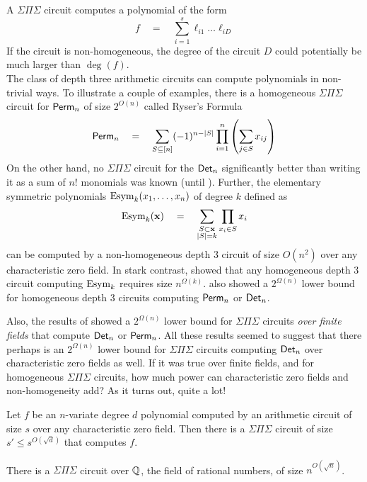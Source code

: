\documentclass{beatcs}
\newcommand{\spaced}[1]{\quad#1\quad}
\newcommand{\SPS}{\Sigma\Pi\Sigma}
\begin{document}
A $\Sigma\Pi\Sigma$ circuit computes a polynomial of the form
\[
f\quad=\quad \sum_{i=1}^s \ell_{i1}\dots \ell_{iD}
\]
If the circuit is non-homogeneous, the degree of the circuit $D$ could potentially be much larger than $\deg(f)$. \\

The class of depth three arithmetic circuits can compute polynomials in non-trivial ways. To illustrate a couple of examples, there is a homogeneous $\SPS$ circuit for $\mathsf{Perm}_n$ of size $2^{O(n)}$ called Ryser's Formula \cite{rys63}
\begin{equation}\label{eqn:ryser}
\Perm_n \spaced{=} \sum_{S \subseteq[n]} (-1)^{n - |S|} \prod_{i=1}^n \inparen{\sum_{j\in S} x_{ij}}
\end{equation}
On the other hand, no $\SPS$ circuit for the $\mathsf{Det}_n$ significantly better than writing it as a sum of $n!$ monomials was known (until \cite{gkks13b}). 
Further, the elementary symmetric polynomials $\mathrm{Esym}_k(x_1,\dots, x_n)$ of degree $k$ defined as
\[
\ESym_k(\vecx) \spaced{=} \sum_{\substack{S\subset \vecx\\|S| = k}} \prod_{x_i\in S}x_i
\]
can be computed by a non-homogeneous depth $3$ circuit of size $O(n^2)$ over any characteristic zero field. In stark contrast, \cite{nw1997} showed that any homogeneous depth $3$ circuit computing $\mathrm{Esym}_k$ requires size $n^{\Omega(k)}$. \cite{nw1997} also showed a $2^{\Omega(n)}$ lower bound for homogeneous depth $3$ circuits computing $\mathsf{Perm}_n$ or $\mathsf{Det}_n$. 

Also, the results of \cite{gr00,grigoriev98} showed a $2^{\Omega(n)}$ lower bound for $\SPS$ circuits \emph{over finite fields} that compute $\mathsf{Det}_n$ or $\mathsf{Perm}_n$. All these results seemed to suggest that there perhaps is an $2^{\Omega(n)}$ 
lower bound for $\SPS$ circuits computing $\mathsf{Det}_n$ over characteristic zero fields as well. If it was true over finite fields, and for homogeneous $\SPS$ circuits, how much power can characteristic zero fields and non-homogeneity add? As it turns out, quite a lot!

\begin{theorem} \label{thm:chasm-at-3}
Let $f$ be an $n$-variate degree $d$ polynomial computed by an arithmetic circuit of size $s$ over any characteristic zero field. Then there is a $\SPS$ circuit of size $s' \leq s^{O(\sqrt{d})}$ that computes $f$. 
\end{theorem}
\begin{corollary}\label{cor:det-sps}
There is a $\SPS$ circuit over $\mathbb{Q}$, the field of rational numbers, of size $n^{O(\sqrt{n})}$. 
\end{corollary}
\end{document}
